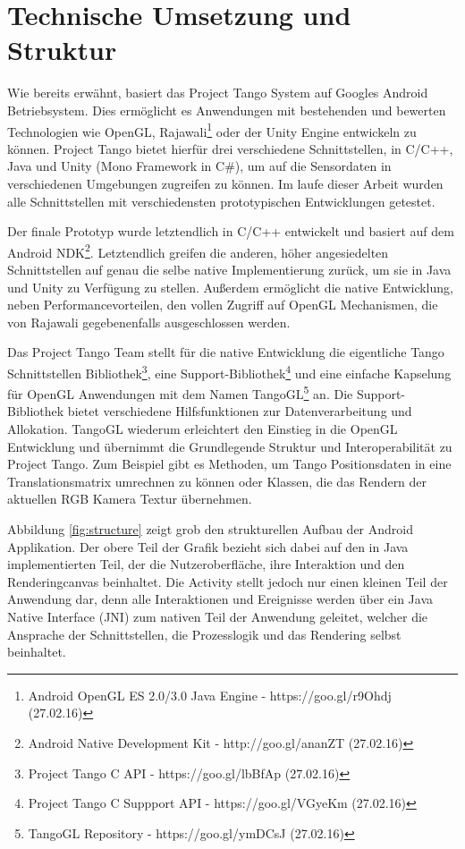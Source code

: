 \section{Technische Umsetzung und Struktur} \label{eq:technic}

Wie bereits erwähnt, basiert das Project Tango System auf Googles Android Betriebsystem. Dies ermöglicht es Anwendungen mit bestehenden und bewerten Technologien wie OpenGL, Rajawali\footnote{Android OpenGL ES 2.0/3.0 Java Engine - https://goo.gl/r9Ohdj (27.02.16)} oder der Unity Engine entwickeln zu können. Project Tango bietet hierfür drei verschiedene Schnittstellen, in C/C++, Java und Unity (Mono Framework in C\#), um auf die Sensordaten in verschiedenen Umgebungen zugreifen zu können. Im laufe dieser Arbeit wurden alle Schnittstellen mit verschiedensten prototypischen Entwicklungen getestet.

Der finale Prototyp wurde letztendlich in C/C++ entwickelt und basiert auf dem Android NDK\footnote{Android Native Development Kit - http://goo.gl/ananZT (27.02.16)}. Letztendlich greifen die anderen, höher angesiedelten Schnittstellen auf genau die selbe native Implementierung zurück, um sie in Java und Unity zu Verfügung zu stellen. Außerdem ermöglicht die native Entwicklung, neben Performancevorteilen, den vollen Zugriff auf OpenGL Mechanismen, die von Rajawali gegebenenfalls ausgeschlossen werden. 

Das Project Tango Team stellt für die native Entwicklung die eigentliche Tango Schnittstellen Bibliothek\footnote{Project Tango C API - https://goo.gl/lbBfAp (27.02.16)}, eine Support-Bibliothek\footnote{Project Tango C Suppport API - https://goo.gl/VGyeKm (27.02.16)} und eine einfache Kapselung für OpenGL Anwendungen mit dem Namen TangoGL\footnote{TangoGL Repository - https://goo.gl/ymDCsJ (27.02.16)} an. Die Support-Bibliothek bietet verschiedene Hilfsfunktionen zur Datenverarbeitung und Allokation. TangoGL wiederum erleichtert den Einstieg in die OpenGL Entwicklung und übernimmt die Grundlegende Struktur und Interoperabilität zu Project Tango. Zum Beispiel gibt es Methoden, um Tango Positionsdaten in eine Translationsmatrix umrechnen zu können oder Klassen, die das Rendern der aktuellen RGB Kamera Textur übernehmen. 

Abbildung \ref{fig:structure} zeigt grob den strukturellen Aufbau der Android Applikation. Der obere Teil der Grafik bezieht sich dabei auf den in Java implementierten Teil, der die Nutzeroberfläche, ihre Interaktion und den Renderingcanvas beinhaltet. Die Activity stellt jedoch nur einen kleinen Teil der Anwendung dar, denn alle Interaktionen und Ereignisse werden über ein Java Native Interface (JNI) zum nativen Teil der Anwendung geleitet, welcher die Ansprache der Schnittstellen, die Prozesslogik und das Rendering selbst beinhaltet. 

